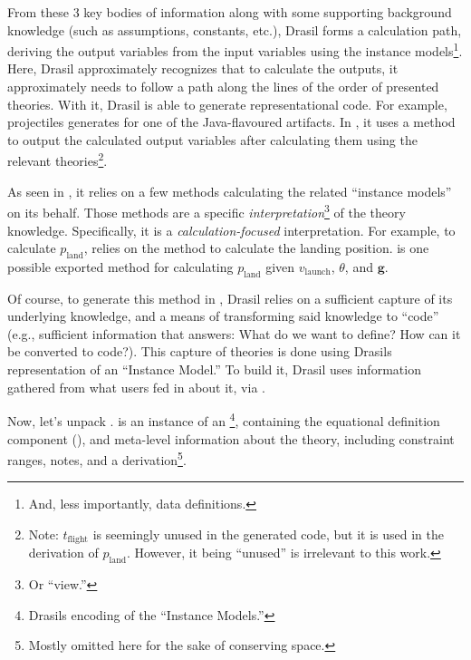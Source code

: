 From these 3 key bodies of information along with some supporting background
knowledge (such as assumptions, constants, etc.), Drasil forms a calculation
path, deriving the output variables from the input variables using the instance
models\footnote{And, less importantly, data definitions.}. Here, Drasil
approximately recognizes that to calculate the outputs, it approximately needs
to follow a path along the lines of the order of presented theories. With it,
Drasil is able to generate representational code. For example, \acsp{projectile}
generates  for one of the Java-flavoured
artifacts. In , it uses a
 method to output the calculated output variables
after calculating them using the relevant theories\footnote{Note:
\(t_\text{flight}\) is seemingly unused in the generated code, but it is used in
the derivation of \(p_\text{land}\). However, it being ``unused'' is irrelevant
to this work.}.

\originalJavaProjectileMain{}

As seen in , it relies on a few methods
calculating the related ``instance models'' on its behalf. Those methods are a
specific \textit{interpretation}\footnote{Or ``view.''} of the theory knowledge.
Specifically, it is a \textit{calculation-focused} interpretation. For example,
to calculate \(p_\text{land}\),  relies on the
method  to calculate the landing position.
 is one possible exported method for
calculating \(p_\text{land}\) given \(v_\text{launch}\), \(\theta\), and
\(\mathbf{g}\).

\originalJavaProjectilePLandMethod{}

Of course, to generate this method in ,
Drasil relies on a sufficient capture of its underlying knowledge, and a means
of transforming said knowledge to ``code'' (e.g., sufficient information that
answers: What do we want to define? How can it be converted to code?). This
capture of theories is done using Drasils representation of an ``Instance
Model.'' To build it, Drasil uses information gathered from what users fed in
about it, via .

\originalLandPosTheoryDefinition{}

Now, let's unpack .  is
an instance of an \InstanceModel{}\footnote{Drasils encoding of the ``Instance
    Models.''}, containing the equational definition component
(), and meta-level information about the theory, including
constraint ranges, notes, and a derivation\footnote{Mostly omitted here for the
    sake of conserving space.}.

